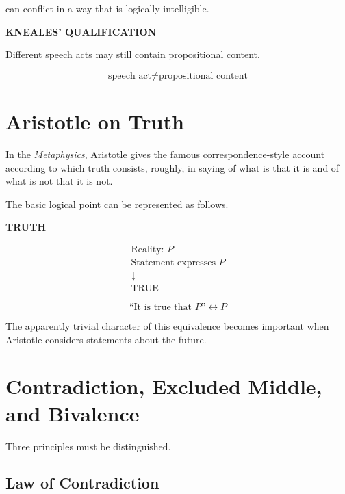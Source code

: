 \documentclass[11pt]{article}
\begin{document}
can conflict in a way that is logically intelligible.

\begin{whiteboard}
\textbf{KNEALES' QUALIFICATION}

Different speech acts may still
contain propositional content.

\[
\text{speech act}
\neq
\text{propositional content}
\]
\end{whiteboard}

\section{Aristotle on Truth}

In the \textit{Metaphysics}, Aristotle gives the famous
correspondence-style account according to which truth consists,
roughly, in saying of what is that it is and of what is not that it
is not.

The basic logical point can be represented as follows.

\begin{whiteboard}
\textbf{TRUTH}

\[
\begin{array}{c}
\text{Reality: }P\\
\text{Statement expresses }P\\
\downarrow\\
\text{TRUE}
\end{array}
\]

\vspace{0.5em}

\[
\boxed{\text{``It is true that }P\text{''} \leftrightarrow P}
\]
\end{whiteboard}

The apparently trivial character of this equivalence becomes
important when Aristotle considers statements about the future.

\section{Contradiction, Excluded Middle, and Bivalence}

Three principles must be distinguished.

\subsection{Law of Contradiction}
\end{document}
